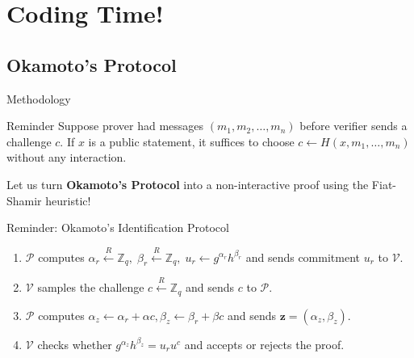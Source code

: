 \documentclass[xcolor={usenames,dvipsnames}]{beamer}
\begin{document}
    \section{Coding Time!}

    \subsection{Okamoto's Protocol}
    \begin{frame}{Methodology}
        \begin{block}{Reminder}
            Suppose prover had messages $(m_1,m_2,\dots,m_n)$ before verifier sends a challenge $c$. If $x$ is a public statement, it suffices to choose $c \gets H(x,m_1,\dots,m_n)$ without any interaction.\pause
        \end{block}

        Let us turn \textbf{Okamoto's Protocol} into a non-interactive proof using the Fiat-Shamir heuristic! \pause

        \begin{block}{Reminder: Okamoto's Identification Protocol}
            \begin{enumerate}
                \item $\mathcal{P}$ computes $\alpha_r \xleftarrow{R} \mathbb{Z}_q, \; \beta_r \xleftarrow{R} \mathbb{Z}_q, \; u_r \gets g^{\alpha_r}h^{\beta_r}$ and sends commitment $u_r$ to $\mathcal{V}$.
                \item $\mathcal{V}$ samples the challenge $c \xleftarrow{R} \mathbb{Z}_q$ and sends $c$ to $\mathcal{P}$.
                \item $\mathcal{P}$ computes $\alpha_z \gets \alpha_r + \alpha c, \beta_z \gets \beta_r + \beta c$ and sends $\mathbf{z} = (\alpha_z,\beta_z)$.
                \item $\mathcal{V}$ checks whether $g^{\alpha_z}h^{\beta_z} = u_r u^c$ and accepts or rejects the proof.
            \end{enumerate}
        \end{block}
    \end{frame}
\end{document}
